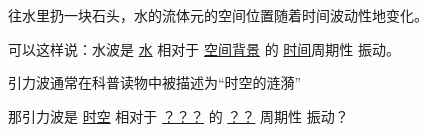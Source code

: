 \documentclass[CJK,13pt]{beamer}
\date{}
\begin{document}
  \bch

  \begin{frame}

    往水里扔一块石头，水的流体元的空间位置随着时间波动性地变化。


    可以这样说：水波是 \uline{水} 相对于 \uline{空间背景} 的 \uline{时间}周期性 振动。

  \end{frame}

  
  \begin{frame}
    引力波通常在科普读物中被描述为“时空的涟漪”
    

    那引力波是 \uline{时空} 相对于 \uline{？？？} 的 \uline{？？} 周期性 振动？

  \end{frame}

    \ech
\end{document}
